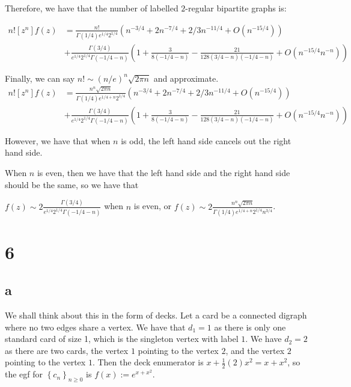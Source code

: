 \documentclass[]{article}
\begin{document}
Therefore, we have that the number of labelled $2$-regular bipartite graphs is:

\begin{align}
	n! [z^n] f(z)&=
\frac{n!}{\Gamma(1/4) e^{1/4} 2^{1/4}}\left( n^{-3/4} +  2 n^{-7/4} + 2/3 n^{-11/4} + O(n^{-15/4}) \right)\\ 
&+
\frac{\Gamma(3/4)}{e^{1/4} 2^{1/4} \Gamma(-1/4 - n)}  \left(1+ \frac{3}{8 (-1/4 - n)} - \frac{21}{128 (3/4 - n)(-1/4 - n)}+  O(n^{-15/4} n^{-n})\right)
\end{align}

Finally, we can say $n! \sim (n/e)^n\sqrt{2 \pi n}$ and approximate. 
\begin{align}
	n! [z^n] f(z)&=
	\frac{n^n \sqrt{2 \pi n}}{\Gamma(1/4) e^{1/4 + n} 2^{1/4}}\left( n^{-3/4} +  2 n^{-7/4} + 2/3 n^{-11/4} + O(n^{-15/4}) \right)\\ 
	&+
	\frac{\Gamma(3/4)}{e^{1/4} 2^{1/4} \Gamma(-1/4 - n)}  \left(1+ \frac{3}{8 (-1/4 - n)} - \frac{21}{128 (3/4 - n)(-1/4 - n)}+  O(n^{-15/4} n^{-n})\right)
\end{align}

However, we have that when $n$ is odd, the left hand side cancels out the right hand side.

When $n$ is even, then we have that the left hand side and the right hand side should be the same, so we have that

$f(z) \sim 2 \frac{\Gamma(3/4)}{e^{1/4} 2^{1/4} \Gamma(-1/4 - n)}$ when $n$ is even, or
$f(z) \sim 2\frac{n^n \sqrt{2 \pi n}}{\Gamma(1/4) e^{1/4 + n} 2^{1/4} n^{3/4}}$. 
\section{6}
\subsection{a}
We shall think about this in the form of decks. Let a card be a connected digraph where no two edges share a vertex. We have that $d_1 = 1$ as there is only one standard card of size 1, which is the singleton vertex with label $1$. We have $d_2 = 2$ as there are two cards, the vertex $1$ pointing to the vertex $2$, and the vertex $2$ pointing to the vertex $1$. Then the deck enumerator is $x + \frac{1}{2} (2) x^2 = x + x^2$, so the egf for $\left\{ c_n\right\}_{n \geq 0}$ is $f(x) := e^{x + x^2}$.
\end{document}
